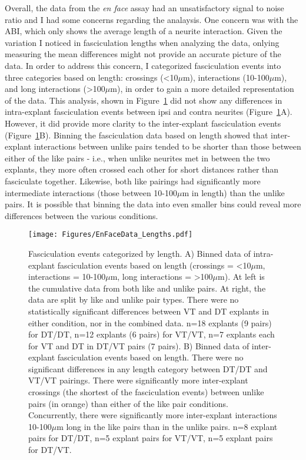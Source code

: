 Overall, the data from the \emph{en face} assay had an unsatisfactory signal to noise ratio and I had some concerns regarding the analaysis.
One concern was with the ABI, which only shows the average length of a neurite interaction.
Given the variation I noticed in fasciculation lengths when analyzing the data, onlying measuring the mean differences might not provide an accurate picture of the data.
In order to address this concern, I categorized fasciculation events into three categories based on length: crossings (<10$\mu$m), interactions (10-100$\mu$m), and long interactions (>100$\mu$m), in order to gain a more detailed representation of the data.
This analysis, shown in Figure~\ref{Figures/EnFaceData_Lengths} did not show any differences in intra-explant fasciculation events between ipsi and contra neurites (Figure~\ref{Figures/EnFaceData_Lengths}A).
However, it did provide more clarity to the inter-explant fasciculation events (Figure~\ref{Figures/EnFaceData_Lengths}B).
Binning the fasciculation data based on length showed that inter-explant interactions between unlike pairs tended to be shorter than those between either of the like pairs - i.e., when unlike neurites met in between the two explants, they more often crossed each other for short distances rather than fasciculate together.
Likewise, both like pairings had significantly more intermediate interactions (those between 10-100$\mu$m in length) than the unlike pairs.
It is possible that binning the data into even smaller bins could reveal more differences between the various conditions.
\begin{figure}[hbtp]
    \begin{center}
        \texttt{[image: Figures/EnFaceData\_Lengths.pdf]}
        \caption[Fasciculation events categorized by length.]
        {Fasciculation events categorized by length.
		A) Binned data of intra-explant fasciculation events based on length (crossings = <10$\mu$m, interactions = 10-100$\mu$m, long interactions = >100$\mu$m).
		At left is the cumulative data from both like and unlike pairs.
		At right, the data are split by like and unlike pair types.
		There were no statistically significant differences between VT and DT explants in either condition, nor in the combined data.
		n=18 explants (9 pairs) for DT/DT, n=12 explants (6 pairs) for VT/VT, n=7 explants each for VT and DT in DT/VT pairs (7 pairs).
		B) Binned data of inter-explant fasciculation events based on length.
		There were no significant differences in any length category between DT/DT and VT/VT pairings.
		There were significantly more inter-explant crossings (the shortest of the fasciculation events) between unlike pairs (in orange) than either of the like pair conditions.
		Concurrently, there were significantly more inter-explant interactions 10-100$\mu$m long in the like pairs than in the unlike pairs. 
		n=8 explant pairs for DT/DT, n=5 explant pairs for VT/VT, n=5 explant pairs for DT/VT.
		}
        \label{Figures/EnFaceData_Lengths}
    \end{center}
\end{figure}

